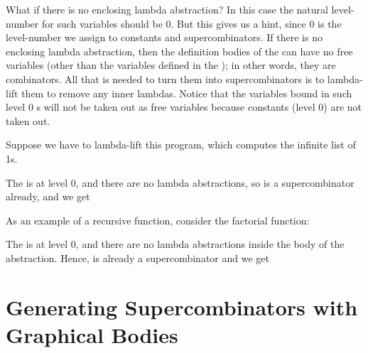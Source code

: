 What if there is no enclosing lambda abstraction? In this case the natural
level-number for such variables should be 0. But this gives us a hint, since 0 is
the level-number we assign to constants and supercombinators. If there is no
enclosing lambda abstraction, then the definition bodies of the  can have
no free variables (other than the variables defined in the ); in other words,
they are combinators. All that is needed to turn them into supercombinators
is to lambda-lift them to remove any inner lambdas. Notice that the variables
bound in such level 0 s will not be taken out as free variables because
constants (level 0) are not taken out.

Suppose we have to lambda-lift this program, which computes the infinite
list of 1s.


\noindent
The  is at level 0, and there are no lambda abstractions, so  is a
supercombinator already, and we get


As an example of a recursive function, consider the factorial function:


\noindent
The  is at level 0, and there are no lambda abstractions inside the body of
the  abstraction. Hence,  is already a supercombinator and we get


\section{Generating Supercombinators with Graphical Bodies}

